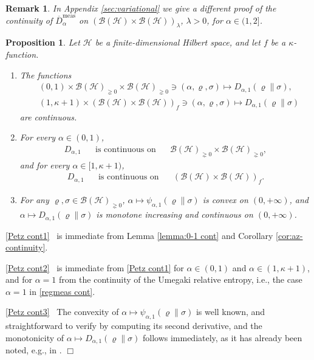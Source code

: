 \documentclass[unsortedaddress,superscriptaddress,pra,notitlepage]{revtex4}
\newtheorem{prop}[definition]{Proposition}
\newtheorem{rem}[definition]{Remark}
\newenvironment{proof}[1][Proof]{\begin{trivlist}
\item[\hskip \labelsep {\bfseries #1}]}{\hfill$\Box$\end{trivlist}}
\def\B{{\mathcal B}}
\def\rho{\varrho}
\def\hil{{\mathcal H}}
\def\bz{\left(}
\def\jz{\right)}
\def\oll{\overline}
\def\meas{\mathrm{meas}}
\def\pne{_{\gneq 0}}
\def\pwr{\kappa}
\newcommand{\s}{\mbox{ }}
\newcommand{\ds}{\mbox{ }\mbox{ }}
\begin{document}
\begin{rem}
In Appendix \ref{sec:variational} we give a different proof of the 
continuity of $\oll{D}_{\alpha}^{\meas}$ on $\bz\B(\hil)\times\B(\hil)\jz_{\lambda}$,
$\lambda>0$, 
for $\alpha\in(1,2]$.
\end{rem}

\begin{prop}\label{prop:Petz cont}
Let $\hil$ be a finite-dimensional Hilbert space, and let $f$ be a $\pwr$-function.
\begin{enumerate}
\item\label{Petz cont1}
The functions 
\begin{align}
&(0,1)\times\B(\hil)\pne\times\B(\hil)\pne\ni(\alpha,\rho,\sigma)\mapsto
D_{\alpha,1}(\rho\|\sigma),\label{Petz jointcont}\\
&(1,\pwr+1)\times\bz\B(\hil)\times\B(\hil)\jz_{f}\ni(\alpha,\rho,\sigma)\mapsto
D_{\alpha,1}(\rho\|\sigma)\label{Petz jointcont2}
\end{align}
are continuous.
\item\label{Petz cont2}
For every $\alpha\in(0,1)$,
\begin{align}\label{Petz contt1}
D_{\alpha,1} \ds\text{ is continuous on  }\ds\B(\hil)\pne\times\B(\hil)\pne,
\end{align}
and for every $\alpha\in[1,\pwr+1)$,
\begin{align}\label{Petz contt2}
D_{\alpha,1} \ds\text{ is continuous on  }\ds
\bz\B(\hil)\times\B(\hil)\jz_{f}.
\end{align}
\item\label{Petz cont3}
For any $\rho,\sigma\in \B(\hil)\pne$,
$\alpha\mapsto\psi_{\alpha,1}(\rho\|\sigma)$ is convex on $(0,+\infty)$, and 
$\alpha\mapsto D_{\alpha,1}(\rho\|\sigma)$ is monotone increasing and continuous
 on $(0,+\infty)$.
\end{enumerate}
\end{prop}
\begin{proof}
\ref{Petz cont1}\s 
is immediate from Lemma \ref{lemma:0-1 cont} and 
Corollary \ref{cor:az-continuity}.

\ref{Petz cont2}\s
is immediate from \ref{Petz cont1} for $\alpha\in(0,1)$ and $\alpha\in(1,\pwr+1)$, 
and for $\alpha=1$ from the continuity of the Umegaki relative entropy, i.e., the case 
$\alpha=1$ in \eqref{regmeas cont}.

\ref{Petz cont3}\s
The convexity of $\alpha\mapsto\psi_{\alpha,1}(\rho\|\sigma)$ is well known, and straightforward to verify by computing its second derivative, 
and the monotonicity of 
$\alpha\mapsto D_{\alpha,1}(\rho\|\sigma)$ follows immediately, 
as it has already been noted, e.g., in \cite[Lemma II.2]{MH}.
\end{proof}
\end{document}
